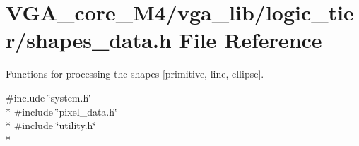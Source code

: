 \section{V\+G\+A\+\_\+core\+\_\+\+M4/vga\+\_\+lib/logic\+\_\+tier/shapes\+\_\+data.h File Reference}
\label{shapes__data_8h}


Functions for processing the shapes [primitive, line, ellipse].  


{\ttfamily \#include \char`\"{}system.\+h\char`\"{}}\\*
{\ttfamily \#include \char`\"{}pixel\+\_\+data.\+h\char`\"{}}\\*
{\ttfamily \#include \char`\"{}utility.\+h\char`\"{}}\\*
